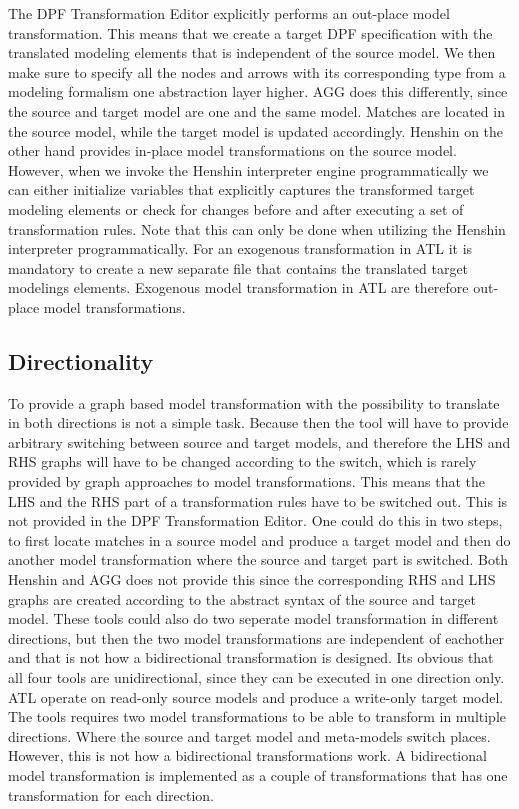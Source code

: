 The DPF Transformation Editor explicitly performs an out-place model
transformation. This means that we create a target DPF specification with the
translated modeling elements that is independent of the source model. We then
make sure to specify all the nodes and arrows with its corresponding type from
a modeling formalism one abstraction layer higher. AGG does this differently,
since the source and target model are one and the same model. Matches are
located in the source model, while the target model is updated accordingly.
Henshin on the other hand provides in-place model transformations on the source
model. However, when we invoke the Henshin interpreter engine programmatically
we can either initialize variables that explicitly captures the transformed
target modeling elements or check for changes before and after executing a set
of transformation rules. Note that this can only be done when utilizing the
Henshin interpreter programmatically. For an exogenous transformation in ATL it
is mandatory to create a new separate file that contains the translated target
modelings elements. Exogenous model transformation in ATL are therefore
out-place model transformations.

\subsection{Directionality}

To provide a graph based model transformation with the possibility to translate
in both directions is not a simple task. Because then the tool will have to
provide arbitrary switching between source and target models, and therefore the
LHS and RHS graphs will have to be changed according to the switch,
which is rarely provided by graph approaches to model transformations.
This means that the LHS and the RHS part of a transformation rules have to be
switched out. This is not provided in the DPF Transformation Editor. One could do
this in two steps, to first locate matches in a source model and produce a
target model and then do another model transformation where the source and
target part is switched. Both Henshin and AGG does not provide this since the
corresponding RHS and LHS graphs are created according to the abstract syntax of
the source and target model. These tools could also do two seperate model
transformation in different directions, but then the two model transformations
are independent of eachother and that is not how a bidirectional transformation
is designed. Its obvious that all four tools are unidirectional, since they can
be executed in one direction only. ATL operate on read-only source models and
produce  a write-only target model. The tools requires two model
transformations to be able to transform in multiple directions. Where the
source and target model and meta-models switch places. However, this is not how
a bidirectional transformations work. A bidirectional model transformation is
implemented as a couple of transformations that has one transformation for each
direction.

